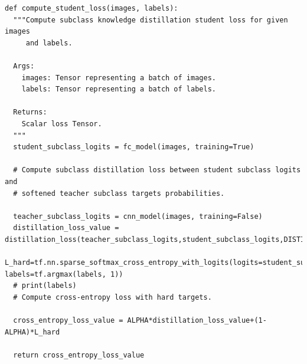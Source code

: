 \documentclass[conference]{IEEEtran}
\begin{document}
\begin{lstlisting}
def compute_student_loss(images, labels):
  """Compute subclass knowledge distillation student loss for given images
     and labels.

  Args:
    images: Tensor representing a batch of images.
    labels: Tensor representing a batch of labels.

  Returns:
    Scalar loss Tensor.
  """
  student_subclass_logits = fc_model(images, training=True)

  # Compute subclass distillation loss between student subclass logits and
  # softened teacher subclass targets probabilities.

  teacher_subclass_logits = cnn_model(images, training=False)
  distillation_loss_value = distillation_loss(teacher_subclass_logits,student_subclass_logits,DISTILLATION_TEMPERATURE)
  L_hard=tf.nn.sparse_softmax_cross_entropy_with_logits(logits=student_subclass_logits, labels=tf.argmax(labels, 1))
  # print(labels)
  # Compute cross-entropy loss with hard targets.

  cross_entropy_loss_value = ALPHA*distillation_loss_value+(1-ALPHA)*L_hard

  return cross_entropy_loss_value
\end{lstlisting}
\end{document}

